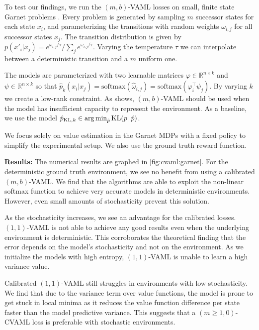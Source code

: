 To test our findings, we run the $(m,b)$-VAML losses on small, finite state Garnet problems \parencite{bhatnagar2007incremental}.
Every problem is generated by sampling $m$ successor states for each state $x_i$, and parameterizing the transitions with random weights $\omega_{i,j}$ for all successor states $x_j$.
The transition distribution is given by $p(x'_i|x_j) = {e^{\omega_{i,j}/\tau}}/{\sum_j e^{\omega_{i,j}/\tau}}$.
Varying the temperature $\tau$ we can interpolate between a deterministic transition and a $m$ uniform one.

The models are parameterized with two learnable matrices $\varphi \in \mathbb{R}^{n\times k}$ and $\psi \in \mathbb{R}^{n\times k}$ so that $\hat{p}_k(x_i| x_j)  = \mathrm{softmax}(\hat{\omega}_{i,j}) = \mathrm{softmax}(\varphi_i^\top \psi_j)$.
By varying $k$ we create a low-rank constraint.
As \textcite{vaml} shows, $(m,b)$-VAML should be used when the model has insufficient capacity to represent the environment.
As a baseline, we use the model $\hat{p}_{\mathrm{KL}, k}\in \operatorname*{arg\,min}_{\hat{p}} \mathrm{KL}(p||\hat{p})$.

We focus solely on value estimation in the Garnet MDPs with a fixed policy to simplify the experimental setup.
We also use the ground truth reward function.

\textbf{Results:}
The numerical results are graphed in \autoref{fig:cvaml:garnet}.
For the deterministic ground truth environment, we see no benefit from using a calibrated $(m,b)$-VAML.
We find that the algorithms are able to exploit the non-linear softmax function to achieve very accurate models in deterministic environments.
However, even small amounts of stochasticity prevent this solution.

As the stochasticity increases, we see an advantage for the calibrated losses.
$(1,1)$-VAML is not able to achieve any good results even when the underlying environment is deterministic.
This corroborates the theoretical finding that the error depends on the model's stochasticity and not on the environment.
As we initialize the models with high entropy, $(1,1)$-VAML is unable to learn a high variance value.

Calibrated $(1,1)$-VAML still struggles in environments with low stochasticity.
We find that due to the variance term over value functions, the model is prone to get stuck in local minima as it reduces the value function difference per state faster than the model predictive variance.
This suggests that a $(m\geq1,0)$-CVAML loss is preferable with stochastic environments.

